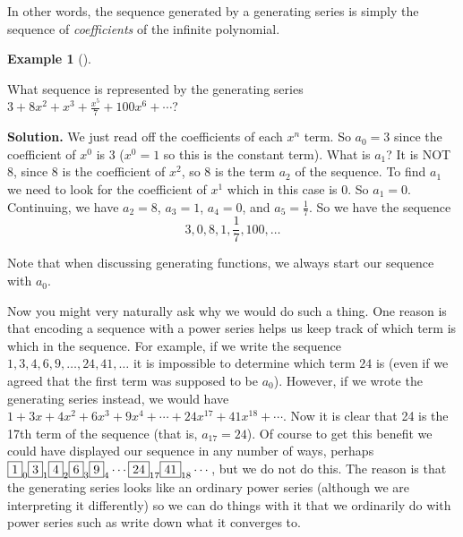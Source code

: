 \documentclass[10pt,]{book}
\theoremstyle{plain}
\theoremstyle{definition}
\newtheorem{example}[theorem]{Example}
\theoremstyle{definition}
\theoremstyle{definition}
\numberwithin{equation}{chapter}
\begin{document}
In other words, the sequence generated by a generating series is simply the sequence of \emph{coefficients} of the infinite polynomial.
%
\begin{example}[]\label{example-109}

What sequence is represented by the generating series \(3 + 8x^2 + x^3 + \frac{x^5}{7} + 100x^6 + \cdots\)?
%
\par\medskip\noindent%
\textbf{Solution.}\quad
We just read off the coefficients of each \(x^n\) term. So \(a_0 = 3\) since the coefficient of \(x^0\) is 3 (\(x^0 = 1\) so this is the constant term). What is \(a_1\)? It is NOT 8, since 8 is the coefficient of \(x^2\), so 8 is the term \(a_2\) of the sequence. To find \(a_1\) we need to look for the coefficient of \(x^1\) which in this case is 0. So \(a_1 = 0\). Continuing, we have \(a_2 = 8\), \(a_3 = 1\), \(a_4 = 0\), and \(a_5 = \frac{1}{7}\). So we have the sequence
\begin{equation*}
  3, 0, 8, 1, \frac{1}{7}, 100, \ldots
\end{equation*}
%
\par

Note that when discussing generating functions, we always start our sequence with \(a_0\).
%
\end{example}
\par

Now you might very naturally ask why we would do such a thing. One reason is that encoding a sequence with a power series helps us keep track of which term is which in the sequence. For example, if we write the sequence \(1, 3, 4, 6, 9, \ldots, 24, 41,\ldots\) it is impossible to determine which term \(24\) is (even if we agreed that the first term was supposed to be \(a_0\)). However, if we wrote the generating series instead, we would have \(1 + 3x + 4x^2 + 6x^3 + 9x^4 + \cdots + 24 x^{17} + 41 x^{18} + \cdots\). Now it is clear that 24 is the 17th term of the sequence (that is, \(a_{17} = 24\)). Of course to get this benefit we could have displayed our sequence in any number of ways, perhaps \(\fbox{1}_0 \fbox{3}_1 \fbox{4}_2 \fbox{6}_3 \fbox{9}_4 \cdots \fbox{24}_{17}\fbox{41}_{18}\cdots\), but we do not do this. The reason is that the generating series looks like an ordinary power series (although we are interpreting it differently) so we can do things with it that we ordinarily do with power series such as write down what it converges to.
%
\par
\end{document}
